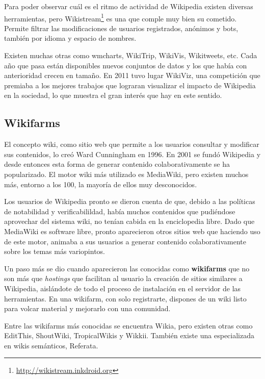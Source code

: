 \documentclass[11pt,onecolumn]{article}
\begin{document}
Para poder observar cuál es el ritmo de actividad de Wikipedia existen diversas herramientas, pero Wikistream\footnote{\href{http://wikistream.inkdroid.org}{http://wikistream.inkdroid.org}} es una que comple muy bien su cometido. Permite filtrar las modificaciones de usuarios registrados, anónimos y bots, también por idioma y espacio de nombres.


Existen muchas otras como wmcharts, WikiTrip, WikiVis, Wikitweets, etc. Cada año que pasa están disponibles nuevos conjuntos de datos y los que había con anterioridad crecen en tamaño. En 2011 tuvo lugar WikiViz, una competición que premiaba a los mejores trabajos que lograran visualizar el impacto de Wikipedia en la sociedad, lo que muestra el gran interés que hay en este sentido.

\subsection{Wikifarms}


El concepto wiki, como sitio web que permite a los usuarios consultar y modificar sus contenidos, lo creó Ward Cunningham en 1996. En 2001 se fundó Wikipedia y desde entonces esta forma de generar contenido colaborativamente se ha popularizado. El motor wiki más utilizado es MediaWiki, pero existen muchos más, entorno a los 100, la mayoría de ellos muy desconocidos.

Los usuarios de Wikipedia pronto se dieron cuenta de que, debido a las políticas de notabilidad y verificabilildad, había muchos contenidos que pudiéndose aprovechar del sistema wiki, no tenían cabida en la enciclopedia libre. Dado que MediaWiki es software libre, pronto aparecieron otros sitios web que haciendo uso de este motor, animaba a sus usuarios a generar contenido colaborativamente sobre los temas más variopintos.

Un paso más se dio cuando aparecieron las conocidas como \textbf{wikifarms} que no son más que \emph{hostings} que facilitan al usuario la creación de sitios similares a Wikipedia, aislándote de todo el proceso de instalación en el servidor de las herramientas. En una wikifarm, con solo registrarte, dispones de un wiki listo para volcar material y mejorarlo con una comunidad.

Entre las wikifarms más conocidas se encuentra Wikia, pero existen otras como EditThis, ShoutWiki, TropicalWikis y Wikkii. También existe una especializada en wikis semánticos, Referata.
\end{document}
